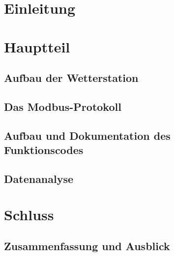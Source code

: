 \documentclass[11pt,a4paper,oneside,ngerman,appendixprefix=true,listof=chapterentry]{report}
\begin{document}




\tableofcontents
\listoffigures
\listoftables
\part{Einleitung}

\part{Hauptteil}
\chapter{Aufbau der Wetterstation}

\chapter{Das Modbus-Protokoll}

\chapter{Aufbau und Dokumentation des Funktionscodes}

\chapter{Datenanalyse}

\part{Schluss}
\chapter{Zusammenfassung und Ausblick}


 
 
\end{document}
